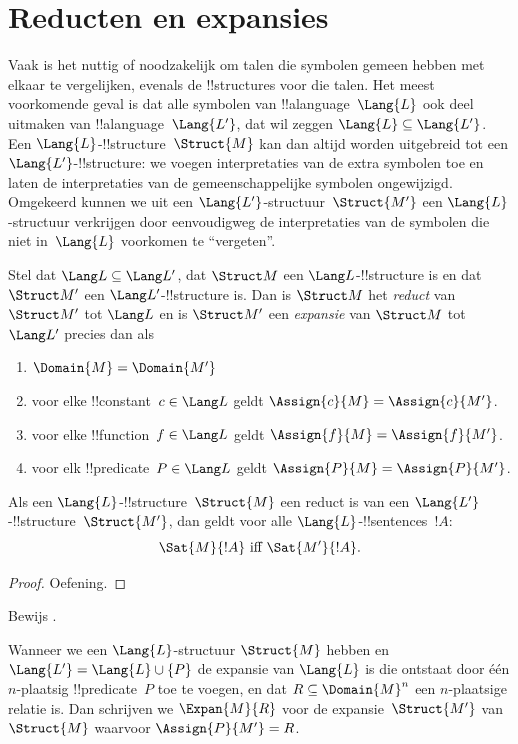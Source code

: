 \documentclass[../../../include/open-logic-section]{subfiles}
\begin{document}
\section{Reducten en expansies}

Vaak is het nuttig of noodzakelijk om talen die symbolen gemeen hebben
met elkaar te vergelijken, evenals de !!{structure}s voor die talen.
Het meest voorkomende geval is dat alle symbolen van
!!a{language}~$\Lang{L}$ ook deel uitmaken van
!!a{language}~$\Lang{L'}$, dat wil zeggen $\Lang{L} \subseteq
\Lang{L'}$. Een $\Lang{L}$-!!{structure}~$\Struct{M}$ kan dan altijd
worden uitgebreid tot een $\Lang{L'}$-!!{structure}: we voegen
interpretaties van de extra symbolen toe en laten de interpretaties van
de gemeenschappelijke symbolen ongewijzigd. Omgekeerd kunnen we uit een
$\Lang{L'}$-structuur~$\Struct{M'}$ een $\Lang{L}$-structuur verkrijgen
door eenvoudigweg de interpretaties van de symbolen die niet
in~$\Lang{L}$ voorkomen te ``vergeten''.

\begin{defn}
Stel dat $\Lang L \subseteq \Lang L'$, dat $\Struct M$ een
$\Lang L$-!!{structure} is en dat $\Struct M'$ een
$\Lang L'$-!!{structure} is. Dan is $\Struct M$ het \emph{reduct} van
$\Struct M'$ tot $\Lang L$ en is $\Struct M'$ een \emph{expansie} van
$\Struct M$ tot $\Lang L'$ precies dan als
\begin{enumerate}
\item $\Domain{M} = \Domain{M'}$
\item voor elke !!{constant}~$c \in \Lang L$ geldt $\Assign{c}{M} =
  \Assign{c}{M'}$.
\item voor elke !!{function}~$f \in \Lang L$ geldt $\Assign{f}{M} =
  \Assign{f}{M'}$.
\item voor elk !!{predicate}~$P \in \Lang L$ geldt $\Assign{P}{M} =
  \Assign{P}{M'}$.
\end{enumerate}
\end{defn}

\begin{prop}
Als een $\Lang{L}$-!!{structure}~$\Struct{M}$ een reduct is van een
$\Lang{L'}$-!!{structure}~$\Struct{M'}$, dan geldt voor alle
$\Lang{L}$-!!{sentence}s~$!A$:
\[
\Sat{M}{!A} \text{ iff } \Sat{M'}{!A}.
\]
\end{prop}

\begin{proof}
  Oefening.
\end{proof}

\begin{prob}
Bewijs .
\end{prob}

\begin{defn}
Wanneer we een $\Lang{L}$-structuur $\Struct{M}$ hebben en $\Lang{L'} =
\Lang{L} \cup \{P\}$ de expansie van $\Lang{L}$ is die ontstaat door
één $n$-plaatsig !!{predicate}~$P$ toe te voegen, en dat
$R \subseteq \Domain{M}^n$ een $n$-plaatsige relatie is. Dan schrijven
we $\Expan{M}{R}$ voor de expansie~$\Struct{M'}$ van~$\Struct{M}$
waarvoor $\Assign{P}{M'} = R$.
\end{defn}
\end{document}
